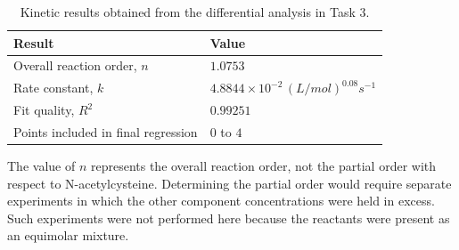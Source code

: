 \begin{table}[htbp]
  \centering
  \caption{Kinetic results obtained from the differential analysis in Task 3.}
  \label{tab:task3-kinetic-results}
  \begin{tabular}{ll}
    \toprule
    Result & Value \\
    \midrule
    Overall reaction order, \(n\) & \(1.0753\) \\
    Rate constant, \(k\) & \(4.8844\times10^{-2}\,
      (\si{L/mol})^{0.08}\si{s^{-1}}\) \\
    Fit quality, \(R^2\) & \(0.99251\) \\
    Points included in final regression & \(0\) to \(4\) \\
    \bottomrule
  \end{tabular}
\end{table}

The value of \(n\) represents the overall reaction order, not the partial
order with respect to N-acetylcysteine. Determining the partial order would
require separate experiments in which the other component concentrations
were held in excess. Such experiments were not performed here because the
reactants were present as an equimolar mixture.
